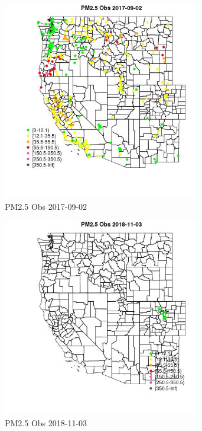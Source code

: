 \begin{figure} 
\centering  
\includegraphics[width=0.77\textwidth]{Code_Outputs/Report_ML_input_PM25_Step4_part_e_de_duplicated_aveswNAs_MapObsPM25_Obs2017-09-02.jpg} 
\caption{\label{fig:Report_ML_input_PM25_Step4_part_e_de_duplicated_aveswNAsMapObsPM25_Obs2017-09-02}PM2.5 Obs 2017-09-02} 
\end{figure} 
 

\begin{figure} 
\centering  
\includegraphics[width=0.77\textwidth]{Code_Outputs/Report_ML_input_PM25_Step4_part_e_de_duplicated_aveswNAs_MapObsPM25_Obs2018-11-03.jpg} 
\caption{\label{fig:Report_ML_input_PM25_Step4_part_e_de_duplicated_aveswNAsMapObsPM25_Obs2018-11-03}PM2.5 Obs 2018-11-03} 
\end{figure} 
 

